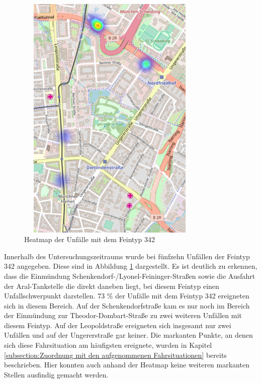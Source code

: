 \begin{savenotes}
	\begin{figure}[H]
		\centering
		\includegraphics[width=9cm,height=12cm]{figures/HM_342}
		\caption[Heatmap der Unfälle mit dem Feintyp 342]{Heatmap der Unfälle mit dem Feintyp 342}\label{fig:Heatmap_342}
	\end{figure}
\end{savenotes}

Innerhalb des Untersuchungszeitraums wurde bei fünfzehn Unfällen der Feintyp 342 angegeben. Diese sind in Abbildung \ref{fig:Heatmap_342} dargestellt. Es ist deutlich zu erkennen, dass die Einmündung Schenkendorf-/Lyonel-Feininger-Straßen sowie die Ausfahrt der Aral-Tankstelle die direkt daneben liegt, bei diesem Feintyp einen Unfallschwerpunkt darstellen. 73 \% der Unfälle mit dem Feintyp 342 ereigneten sich in diesem Bereich. Auf der Schenkendorfstraße kam es nur noch im Bereich der Einmündung zur Theodor-Dombart-Straße zu zwei weiteren Unfällen mit diesem Feintyp. Auf der Leopoldstraße ereigneten sich insgesamt nur zwei Unfällen und auf der Ungererstraße gar keiner. Die markanten Punkte, an denen sich diese Fahrsituation am häufigsten ereignete, wurden in Kapitel \ref{subsection:Zuordnung mit den aufgenommenen Fahrsituationen} bereits beschrieben. Hier konnten auch anhand der Heatmap keine weiteren markanten Stellen ausfindig gemacht werden.

